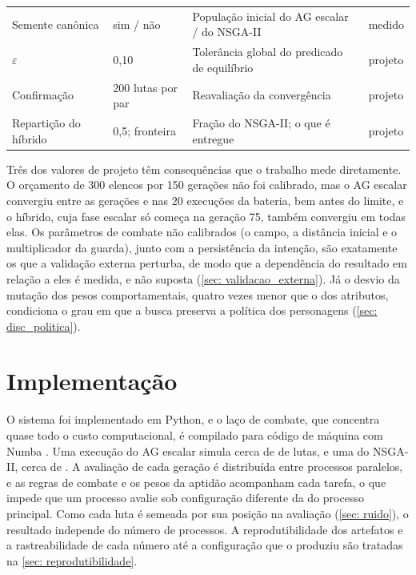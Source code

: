 \begin{table}[htbp]
\begin{tabularx}{\textwidth}{l l X l}
        Semente canônica & sim / não & População inicial do AG escalar / do NSGA-II & medido \\
        $\varepsilon$ & 0,10 & Tolerância global do predicado de equilíbrio & projeto \\
        Confirmação & 200 lutas por par & Reavaliação da convergência & projeto \\
        Repartição do híbrido & 0,5; fronteira & Fração do NSGA-II; o que é entregue & projeto \\
        \bottomrule
    \end{tabularx}
    \source
\end{table}

Três dos valores de projeto têm consequências que o trabalho mede diretamente. O orçamento de 300 elencos por 150 gerações não foi calibrado, mas o AG escalar convergiu entre as gerações \convGerMinAG{} e \convGerMaxAG{} nas 20 execuções da bateria, bem antes do limite, e o híbrido, cuja fase escalar só começa na geração 75, também convergiu em todas elas. Os parâmetros de combate não calibrados (o campo, a distância inicial e o multiplicador da guarda), junto com a persistência da intenção, são exatamente os que a validação externa perturba, de modo que a dependência do resultado em relação a eles é medida, e não suposta (\autoref{sec: validacao_externa}). Já o desvio da mutação dos pesos comportamentais, quatro vezes menor que o dos atributos, condiciona o grau em que a busca preserva a política dos personagens (\autoref{sec: disc_politica}).

\section{Implementação}
\label{sec: implementacao}

O sistema foi implementado em Python, e o laço de combate, que concentra quase todo o custo computacional, é compilado para código de máquina com Numba \cite{lam2015numba}. Uma execução do AG escalar simula cerca de \lutasExecAG{} de lutas, e uma do NSGA-II, cerca de \lutasExecNSGA{}. A avaliação de cada geração é distribuída entre processos paralelos, e as regras de combate e os pesos da aptidão acompanham cada tarefa, o que impede que um processo avalie sob configuração diferente da do processo principal. Como cada luta é semeada por sua posição na avaliação (\autoref{sec: ruido}), o resultado independe do número de processos. A reprodutibilidade dos artefatos e a rastreabilidade de cada número até a configuração que o produziu são tratadas na \autoref{sec: reprodutibilidade}.
